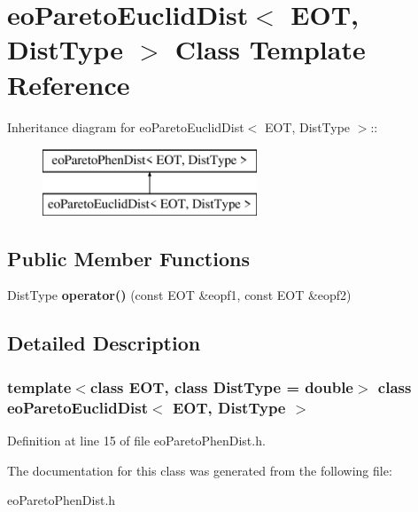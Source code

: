 \section{eo\-Pareto\-Euclid\-Dist$<$ EOT, Dist\-Type $>$ Class Template Reference}
\label{classeoParetoEuclidDist}
Inheritance diagram for eo\-Pareto\-Euclid\-Dist$<$ EOT, Dist\-Type $>$::\begin{figure}[H]
\begin{center}
\leavevmode
\includegraphics[height=2cm]{classeoParetoEuclidDist}
\end{center}
\end{figure}
\subsection*{Public Member Functions}
\begin{CompactItemize}
\item 
Dist\-Type {\bf operator()} (const EOT \&eopf1, const EOT \&eopf2)\label{classeoParetoEuclidDist_8693ded671292b210c3c455fa18c496e}

\end{CompactItemize}


\subsection{Detailed Description}
\subsubsection*{template$<$class EOT, class Dist\-Type = double$>$ class eo\-Pareto\-Euclid\-Dist$<$ EOT, Dist\-Type $>$}





Definition at line 15 of file eo\-Pareto\-Phen\-Dist.h.

The documentation for this class was generated from the following file:\begin{CompactItemize}
\item 
eo\-Pareto\-Phen\-Dist.h\end{CompactItemize}

